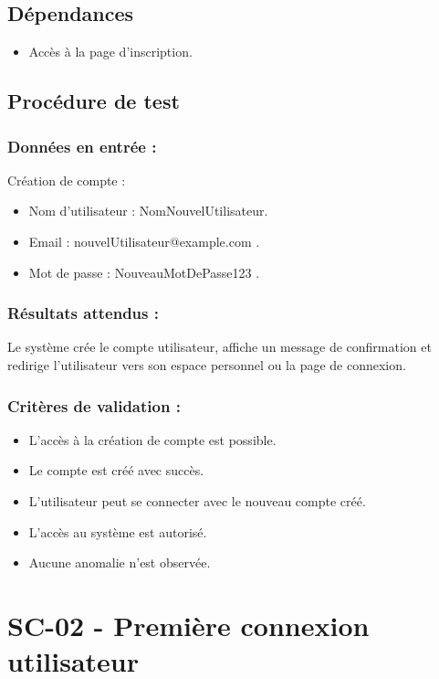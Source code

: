 \documentclass[a4paper,12pt]{report}
\begin{document}
\subsection*{Dépendances}
\begin{itemize}
    \item Accès à la page d’inscription.
\end{itemize}
  
\subsection*{Procédure de test}
\subsubsection{Données en entrée :}
Création de compte :
\begin{itemize}
    \item Nom d’utilisateur : NomNouvelUtilisateur.
    \item Email : nouvelUtilisateur@example.com .
    \item Mot de passe : NouveauMotDePasse123 .
\end{itemize}
\subsubsection{Résultats attendus :}
Le système crée le compte utilisateur, affiche un message de confirmation et redirige l’utilisateur vers son espace personnel ou la page de connexion.

\subsubsection{Critères de validation :}
\begin{itemize}
    \item L’accès à la création de compte est possible.
    \item Le compte est créé avec succès.
    \item L’utilisateur peut se connecter avec le nouveau compte créé.
    \item L’accès au système est autorisé.
    \item Aucune anomalie n’est observée.

\end{itemize} 
\newpage

\section{SC-02 - Première connexion utilisateur}
\label{Co1}
\end{document}
